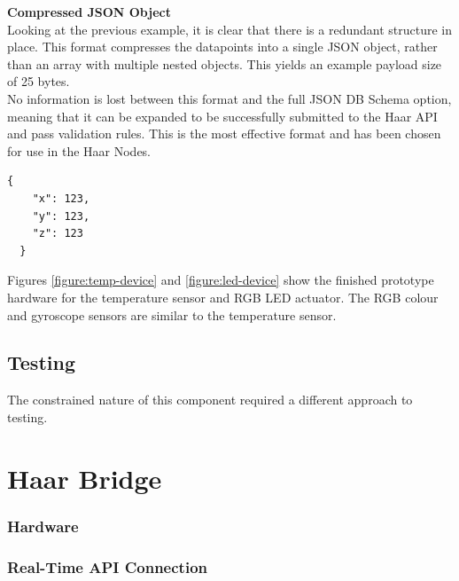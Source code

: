       \noindent
      \begin{minipage}[t]{0.45\textwidth}
        \textbf{Compressed JSON Object}\\
        Looking at the previous example, it is clear that there is a redundant structure in place. This format compresses the datapoints into a single JSON object, rather than an array with multiple nested objects. This yields an example payload size of 25 bytes.\\

        No information is lost between this format and the full JSON DB Schema option, meaning that it can be expanded to be successfully submitted to the Haar API and pass validation rules. This is the most effective format and has been chosen for use in the Haar Nodes. 
      \end{minipage}
      \hfill
      \begin{minipage}[t]{0.45\textwidth}
        \begin{lstlisting}[frame=single]
  {
    "x": 123,
    "y": 123,
    "z": 123
  }
        \end{lstlisting}
      \end{minipage}

      Figures \ref{figure:temp-device} and \ref{figure:led-device} show the finished prototype hardware for the temperature sensor and RGB LED actuator. The RGB colour and gyroscope sensors are similar to the temperature sensor. 

    \subsection{Testing}
      The constrained nature of this component required a different approach to testing.


  \section{Haar Bridge}     
    \subsubsection{Hardware}
    \subsubsection{Real-Time API Connection}
